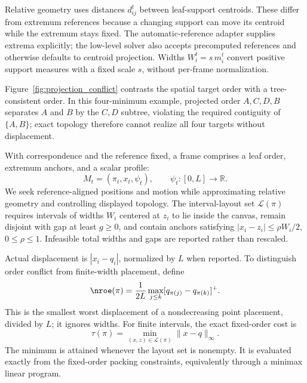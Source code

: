 Relative geometry uses distances $d_{ij}^t$ between leaf-support centroids. These differ from extremum references because a changing support can move its centroid while the extremum stays fixed. The automatic-reference adapter supplies extrema explicitly; the low-level solver also accepts precomputed references and otherwise defaults to centroid projection. Widths $W_i^t=s\,m_i^t$ convert positive support measures with a fixed scale $s$, without per-frame normalization.

Figure~\ref{fig:projection_conflict} contrasts the spatial target order with a tree-consistent order. In this four-minimum example, projected order $A,C,D,B$ separates $A$ and $B$ by the $C,D$ subtree, violating the required contiguity of $\{A,B\}$; exact topology therefore cannot realize all four targets without displacement.



With correspondence and the reference fixed, a frame comprises a leaf order, extremum anchors, and a scalar profile:
\begin{equation}\label{eq:mapframe}
 M_t=(\pi_t,x_t,\psi_t),\qquad\psi_t:[0,L]\to\mathbb{R}.
\end{equation}
We seek reference-aligned positions and motion while approximating relative geometry and controlling displayed topology. The interval-layout set $\mathcal{L}(\pi)$ requires intervals of widths $W_i$ centered at $z_i$ to lie inside the canvas, remain disjoint with gap at least $g\ge0$, and contain anchors satisfying $|x_i-z_i|\le\rho W_i/2$, $0\le\rho\le1$. Infeasible total widths and gaps are reported rather than rescaled.

Actual displacement is $|x_i-q_i|$, normalized by $L$ when reported. To distinguish order conflict from finite-width placement, define
\begin{equation}\label{eq:nroe}
 \nroe(\pi)=\frac{1}{2L}\max_{j\le k}
                      [q_{\pi(j)}-q_{\pi(k)}]^+.
\end{equation}
This is the smallest worst displacement of a nondecreasing point placement, divided by $L$; it ignores widths. For finite intervals, the exact fixed-order cost is
\begin{equation}\label{eq:tau}
 \tau(\pi)=\min_{(x,z)\in\mathcal{L}(\pi)}\|x-q\|_\infty.
\end{equation}
The minimum is attained whenever the layout set is nonempty. It is evaluated exactly from the fixed-order packing constraints, equivalently through a minimax linear program.

